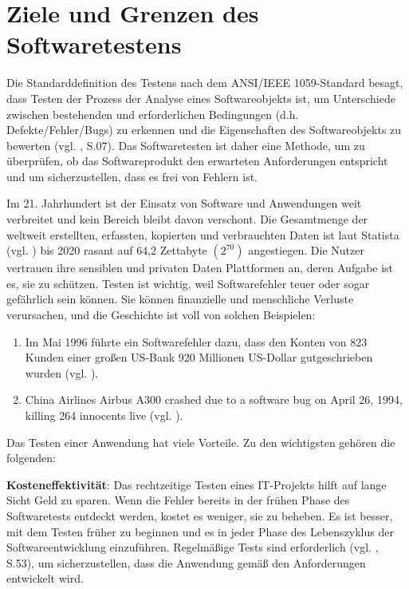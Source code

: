 \section{Ziele und Grenzen des Softwaretestens}

Die Standarddefinition des Testens nach dem
ANSI/IEEE 1059-Standard besagt, dass Testen der
Prozess der Analyse eines Softwareobjekts ist, um
Unterschiede zwischen bestehenden und erforderlichen
Bedingungen (d.h. Defekte/Fehler/Bugs) zu erkennen
und die Eigenschaften des Softwareobjekts zu bewerten (vgl. \cite{singh2012software}, S.07).
Das Softwaretesten ist daher eine Methode, um zu überprüfen,
ob das Softwareprodukt den erwarteten
Anforderungen entspricht und um sicherzustellen, dass
es frei von Fehlern ist.

Im 21. Jahrhundert ist der Einsatz von Software und
Anwendungen weit verbreitet und kein Bereich bleibt
davon verschont. Die Gesamtmenge der weltweit erstellten,
erfassten, kopierten und verbrauchten Daten ist laut
Statista (vgl. \cite{Statista2021}) bis 2020 rasant auf 64,2
Zettabyte \begin{math}(2^{70})\end{math} angestiegen. Die Nutzer vertrauen ihre sensiblen und privaten Daten
Plattformen an, deren Aufgabe ist es, sie zu schützen. Testen
ist wichtig, weil Softwarefehler teuer oder sogar gefährlich
sein können. Sie können finanzielle
und menschliche Verluste verursachen, und die Geschichte
ist voll von solchen Beispielen:

\noindent
\begin{enumerate}
    \item Im Mai 1996 führte ein Softwarefehler dazu, dass
     den Konten von 823 Kunden einer großen US-Bank 920
     Millionen US-Dollar gutgeschrieben wurden (vgl. \cite{Devi2015}).
    \item China Airlines Airbus A300 crashed due to a software bug on April 26,
     1994, killing 264 innocents live (vgl. \cite{Takeuch1996}).
\end{enumerate}

Das Testen einer Anwendung hat viele Vorteile. Zu den wichtigsten
gehören die folgenden:


 \textbf{Kosteneffektivität}: Das
rechtzeitige Testen eines IT-Projekts hilft auf
lange Sicht Geld zu sparen. Wenn die Fehler bereits in
der frühen Phase des Softwaretests entdeckt werden,
kostet es weniger, sie zu beheben. Es ist besser, mit
dem Testen früher zu beginnen und es in jeder Phase des
Lebenszyklus der Softwareentwicklung einzuführen.
Regelmäßige Tests sind erforderlich (vgl. \cite{kumar2010software}, S.53), um
sicherzustellen, dass die Anwendung gemäß den Anforderungen entwickelt wird.

